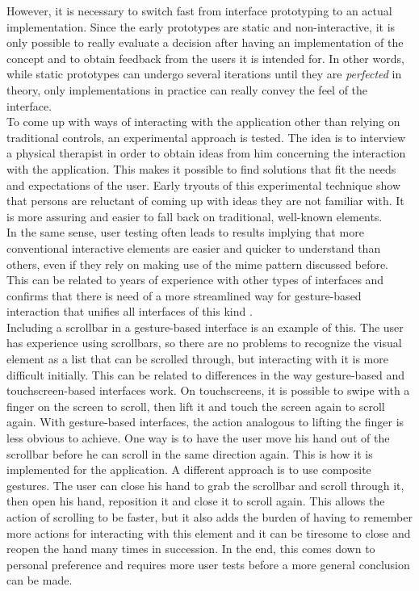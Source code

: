 However, it is necessary to switch fast from interface prototyping to an actual implementation. Since the early prototypes are static and non-interactive, it is only possible to really evaluate a decision after having an implementation of the concept and to obtain feedback from the users it is intended for. In other words, while static prototypes can undergo several iterations until they are \emph{perfected} in theory, only implementations in practice can really convey the feel of the interface.\\

To come up with ways of interacting with the application other than relying on traditional controls, an experimental approach is tested. The idea is to interview a physical therapist in order to obtain ideas from him concerning the interaction with the application. This makes it possible to find solutions that fit the needs and expectations of the user. Early tryouts of this experimental technique show that persons are reluctant of coming up with ideas they are not familiar with. It is more assuring and easier to fall back on traditional, well-known elements.\\

In the same sense, user testing often leads to results implying that more conventional interactive elements are easier and quicker to understand than others, even if they rely on making use of the mime pattern discussed before. This can be related to years of experience with other types of interfaces and confirms that there is need of a more streamlined way for gesture-based interaction that unifies all interfaces of this kind \cite{Norman2010}.\\

Including a scrollbar in a gesture-based interface is an example of this. The user has experience using scrollbars, so there are no problems to recognize the visual element as a list that can be scrolled through, but interacting with it is more difficult initially. This can be related to differences in the way gesture-based and touchscreen-based interfaces work. On touchscreens, it is possible to swipe with a finger on the screen to scroll, then lift it and touch the screen again to scroll again. With gesture-based interfaces, the action analogous to lifting the finger is less obvious to achieve. One way is to have the user move his hand out of the scrollbar before he can scroll in the same direction again. This is how it is implemented for the application. A different approach is to use composite gestures. The user can close his hand to grab the scrollbar and scroll through it, then open his hand, reposition it and close it to scroll again. This allows the action of scrolling to be faster, but it also adds the burden of having to remember more actions for interacting with this element and it can be tiresome to close and reopen the hand many times in succession. In the end, this comes down to personal preference and requires more user tests before a more general conclusion can be made.\\



